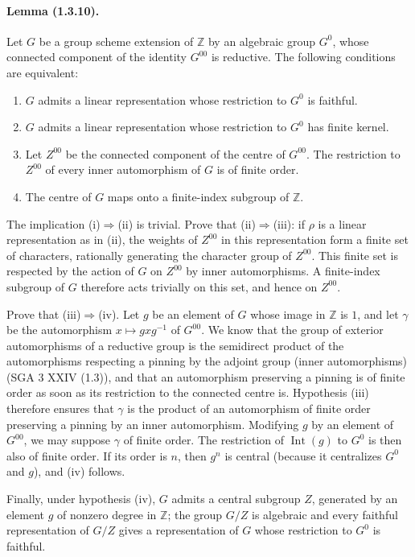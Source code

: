 \documentclass[11pt]{article}
\theoremstyle{remark}
\newcommand{\ZZ}{\mathbb{Z}}
\begin{document}
\paragraph{Lemma (1.3.10).} Let $G$ be a group scheme extension of $\ZZ$ by an algebraic group $G^0$, whose connected component of the identity $G^{00}$ is reductive. The following conditions are equivalent:
\begin{enumerate}[label=(\roman*)]
\item $G$ admits a linear representation whose restriction to $G^0$ is faithful.
\item $G$ admits a linear representation whose restriction to $G^0$ has finite kernel.
\item Let $Z^{00}$ be the connected component of the centre of $G^{00}$. The restriction to $Z^{00}$ of every inner automorphism of $G$ is of finite order.
\item The centre of $G$ maps onto a finite-index subgroup of $\ZZ$.
\end{enumerate}

The implication (i)$\Rightarrow$(ii) is trivial. Prove that (ii)$\Rightarrow$(iii): if $\rho$ is a linear representation as in (ii), the weights of $Z^{00}$ in this representation form a finite set of characters, rationally generating the character group of $Z^{00}$. This finite set is respected by the action of $G$ on $Z^{00}$ by inner automorphisms. A finite-index subgroup of $G$ therefore acts trivially on this set, and hence on $Z^{00}$.

Prove that (iii)$\Rightarrow$(iv). Let $g$ be an element of $G$ whose image in $\ZZ$ is $1$, and let $\gamma$ be the automorphism $x\mapsto gxg^{-1}$ of $G^{00}$. We know that the group of exterior automorphisms of a reductive group is the semidirect product of the automorphisms respecting a pinning by the adjoint group (inner automorphisms) (SGA 3 XXIV (1.3)), and that an automorphism preserving a pinning is of finite order as soon as its restriction to the connected centre is. Hypothesis (iii) therefore ensures that $\gamma$ is the product of an automorphism of finite order preserving a pinning by an inner automorphism. Modifying $g$ by an element of $G^{00}$, we may suppose $\gamma$ of finite order. The restriction of $\operatorname{Int}(g)$ to $G^0$ is then also of finite order. If its order is $n$, then $g^n$ is central (because it centralizes $G^0$ and $g$), and (iv) follows.

Finally, under hypothesis (iv), $G$ admits a central subgroup $Z$, generated by an element $g$ of nonzero degree in $\ZZ$; the group $G/Z$ is algebraic and every faithful representation of $G/Z$ gives a representation of $G$ whose restriction to $G^0$ is faithful.
\end{document}
